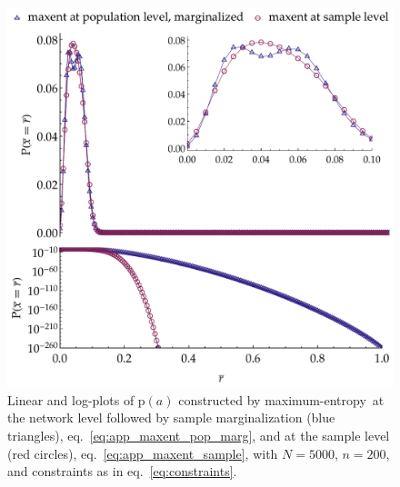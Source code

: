 \documentclass[\ifafour a4paper,12pt,\else a5paper,10pt,\fi%
onecolumn,oneside,article,%
british%
]{memoir}
\theoremstyle{remark}
\theoremstyle{innote}
\newcommand*{\pf}{\mathrm{p}}%
\renewcommand*{\|}{\nonscript\,\vert\nonscript\;\mathopen{}}
\newcommand*{\eqn}{eq.}%
\newcommand*{\yav}{a}
\newcommand*{\yNv}{N}
\newcommand*{\ya}{\yav}%
\newcommand*{\me}{maximum-entropy}
\begin{document}
\begin{figure}[!t]
\centering
\includegraphics[width=\linewidth]{different_maxent_pop_sample_200_realdata_4mom.pdf}%
\caption{Linear and log-plots of $\pf(\ya)$ constructed by \me\ at
  the network level followed by sample marginalization (blue triangles),
  \eqn~\eqref{eq:app_maxent_pop_marg}, and at the sample level (red
  circles), \eqn~\eqref{eq:app_maxent_sample}, with $\yNv=5000$,
  $n=200$, and constraints as in \eqn~\eqref{eq:constraints}.}
\label{fig:diff_maxent_pop_sample_realdata}
\end{figure}%
\fi%
\end{document}
